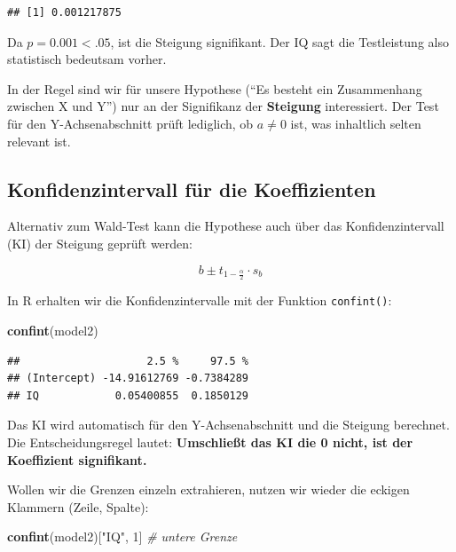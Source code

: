 \documentclass[
]{book}
\newenvironment{Shaded}{\begin{snugshade}}{\end{snugshade}}
\newcommand{\CommentTok}[1]{\textcolor[rgb]{0.56,0.35,0.01}{\textit{#1}}}
\newcommand{\DecValTok}[1]{\textcolor[rgb]{0.00,0.00,0.81}{#1}}
\newcommand{\FunctionTok}[1]{\textcolor[rgb]{0.13,0.29,0.53}{\textbf{#1}}}
\newcommand{\NormalTok}[1]{#1}
\newcommand{\StringTok}[1]{\textcolor[rgb]{0.31,0.60,0.02}{#1}}
\begin{document}
\begin{verbatim}
## [1] 0.001217875
\end{verbatim}

Da \(p=0.001 < .05\), ist die Steigung signifikant. Der IQ sagt die Testleistung also statistisch bedeutsam vorher.

In der Regel sind wir für unsere Hypothese (``Es besteht ein Zusammenhang zwischen X und Y'') nur an der Signifikanz der \textbf{Steigung} interessiert. Der Test für den Y-Achsenabschnitt prüft lediglich, ob \(a \neq 0\) ist, was inhaltlich selten relevant ist.

\subsection{Konfidenzintervall für die Koeffizienten}\label{konfidenzintervall-fuxfcr-die-koeffizienten}

Alternativ zum Wald-Test kann die Hypothese auch über das Konfidenzintervall (KI) der Steigung geprüft werden:

\[b \pm t_{1-\frac{\alpha}{2}} \cdot s_b\]

In R erhalten wir die Konfidenzintervalle mit der Funktion \texttt{confint()}:

\begin{Shaded}
\begin{Highlighting}[]
\FunctionTok{confint}\NormalTok{(model2)}
\end{Highlighting}
\end{Shaded}

\begin{verbatim}
##                    2.5 %     97.5 %
## (Intercept) -14.91612769 -0.7384289
## IQ            0.05400855  0.1850129
\end{verbatim}

Das KI wird automatisch für den Y-Achsenabschnitt und die Steigung berechnet. Die Entscheidungsregel lautet: \textbf{Umschließt das KI die 0 nicht, ist der Koeffizient signifikant.}

Wollen wir die Grenzen einzeln extrahieren, nutzen wir wieder die eckigen Klammern (Zeile, Spalte):

\begin{Shaded}
\begin{Highlighting}[]
\FunctionTok{confint}\NormalTok{(model2)[}\StringTok{"IQ"}\NormalTok{, }\DecValTok{1}\NormalTok{] }\CommentTok{\# untere Grenze}
\end{Highlighting}
\end{Shaded}
\end{document}

